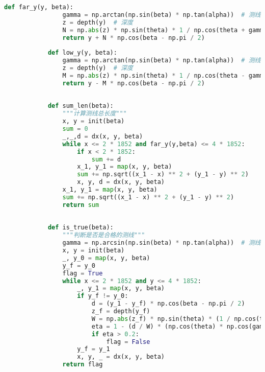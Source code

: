 \documentclass[withoutpreface,bwprint]{cumcmthesis} %
\begin{document}
\begin{appendices}
\begin{lstlisting}[language=python]
            def far_y(y, beta):
                gamma = np.arctan(np.sin(beta) * np.tan(alpha))  # 测线斜波交线和投影夹角
                z = depth(y)  # 深度
                N = np.abs(z) * np.sin(theta) * 1 / np.cos(theta + gamma) * np.cos(gamma) # 平分线一侧覆盖宽度
                return y + N * np.cos(beta - np.pi / 2)
            
            def low_y(y, beta):
                gamma = np.arctan(np.sin(beta) * np.tan(alpha))  # 测线斜波交线和投影夹角
                z = depth(y)  # 深度
                M = np.abs(z) * np.sin(theta) * 1 / np.cos(theta - gamma) * np.cos(gamma) # 平分线一侧覆盖宽度
                return y - M * np.cos(beta - np.pi / 2)
            
            
            def sum_len(beta):
                """计算测线总长度"""
                x, y = init(beta)
                sum = 0
                _,_,d = dx(x, y, beta)
                while x <= 2 * 1852 and far_y(y,beta) <= 4 * 1852:
                    if x < 2 * 1852:
                        sum += d
                    x_1, y_1 = map(x, y, beta)
                    sum += np.sqrt((x_1 - x) ** 2 + (y_1 - y) ** 2)
                    x, y, d = dx(x, y, beta)
                x_1, y_1 = map(x, y, beta)
                sum += np.sqrt((x_1 - x) ** 2 + (y_1 - y) ** 2)
                return sum
            
            
            def is_true(beta):
                """判断是否是合格的测线"""
                gamma = np.arcsin(np.sin(beta) * np.tan(alpha))  # 测线斜波交线和投影夹角
                x, y = init(beta)
                _, y_0 = map(x, y, beta)
                y_f = y_0
                flag = True
                while x <= 2 * 1852 and y <= 4 * 1852:
                    _, y_1 = map(x, y, beta)
                    if y_f != y_0:
                        d = (y_1 - y_f) * np.cos(beta - np.pi / 2)
                        z_f = depth(y_f)
                        W = np.abs(z_f) * np.sin(theta) * (1 / np.cos(theta - gamma) + 1 / np.cos(theta + gamma)) * np.cos(gamma) # 覆盖宽度
                        eta = 1 - (d / W) * (np.cos(theta) * np.cos(gamma) / np.cos(theta - gamma))  # 覆盖率
                        if eta > 0.2:
                            flag = False
                    y_f = y_1
                    x, y, _ = dx(x, y, beta)
                return flag
            

\end{lstlisting}
\end{appendices}
\end{document}
